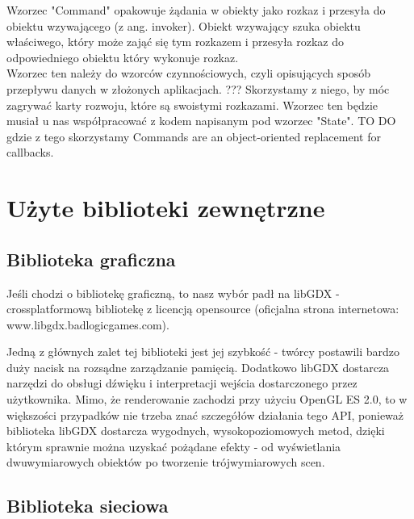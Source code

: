 \documentclass[a4paper, 11pt]{article}
\begin{document}
	Wzorzec "Command" opakowuje żądania w obiekty jako rozkaz i przesyła do obiektu wzywającego (z ang. invoker). Obiekt wzywający szuka obiektu właściwego, który może zająć się tym rozkazem i   przesyła rozkaz do odpowiedniego obiektu który wykonuje rozkaz.\\  
	Wzorzec ten należy do wzorców czynnościowych, czyli opisujących sposób przepływu danych w złożonych aplikacjach.%
	??? Skorzystamy z niego, by móc zagrywać karty rozwoju, które są swoistymi rozkazami. Wzorzec ten będzie musiał u nas współpracować z kodem napisanym pod wzorzec "State". %
	TO DO gdzie z tego skorzystamy
	Commands are an object-oriented replacement for callbacks.\\
	\section{Użyte biblioteki zewnętrzne}
	\subsection{Biblioteka graficzna}
	\indent
	
	Jeśli chodzi o bibliotekę graficzną, to nasz wybór padł na libGDX - crossplatformową bibliotekę z licencją opensource (oficjalna strona internetowa: www.libgdx.badlogicgames.com). 
	
	Jedną z głównych zalet tej biblioteki jest jej szybkość - twórcy postawili bardzo duży nacisk na rozsądne zarządzanie pamięcią.  Dodatkowo libGDX dostarcza narzędzi do obsługi dźwięku i interpretacji wejścia dostarczonego przez użytkownika. Mimo, że renderowanie zachodzi przy użyciu OpenGL ES 2.0, to w większości przypadków nie trzeba znać szczegółów działania tego API, ponieważ biblioteka libGDX dostarcza wygodnych, wysokopoziomowych metod, dzięki którym sprawnie można uzyskać pożądane efekty - od wyświetlania dwuwymiarowych obiektów po tworzenie trójwymiarowych scen.
	

	\subsection{Biblioteka sieciowa}
	\indent
	
\end{document}
